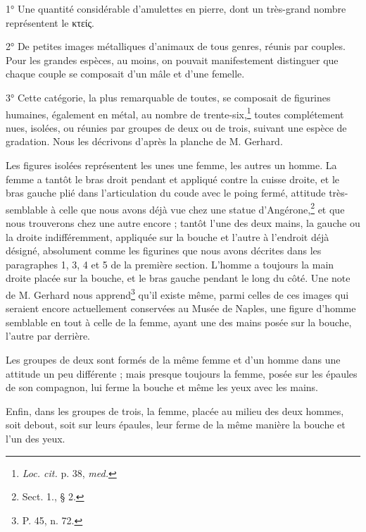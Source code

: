 \documentclass[a4paper, 11pt, oneside, polutonikogreek, french]{article}
\begin{document}
1° Une quantité considérable d'amulettes en pierre, dont un très-grand nombre représentent le κτείς.

2° De petites images métalliques d'animaux de tous genres, réunis par couples. Pour les grandes espèces, au moins, on pouvait manifestement distinguer que chaque couple se composait d'un mâle et d'une femelle.

3° Cette catégorie, la plus remarquable de toutes, se composait de figurines humaines, également en métal, au nombre de trente-six,\footnote{\emph{Loc. cit.} p. 38, \emph{med.}} toutes complétement nues, isolées, ou réunies par groupes de deux ou de trois, suivant une espèce de gradation. Nous les décrivons d'après la planche de M. Gerhard.

Les figures isolées représentent les unes une femme, les autres un homme. La femme a tantôt le bras droit pendant et appliqué contre la cuisse droite, et le bras gauche plié dans l'articulation du coude avec le poing fermé, attitude très-semblable à celle que nous avons déjà vue chez une statue d'Angérone,\footnote{Sect. 1., § 2.} et que nous trouverons chez une autre encore ; tantôt l'une des deux mains, la gauche ou la droite indifféremment, appliquée sur la bouche et l'autre à l'endroit déjà désigné, absolument comme les figurines que nous avons décrites dans les paragraphes 1, 3, 4 et 5 de la première section. L'homme a toujours la main droite placée sur la bouche, et le bras gauche pendant le long du côté. Une note de M. Gerhard nous apprend\footnote{P. 45, n. 72.} qu'il existe même, parmi celles de ces images qui seraient encore actuellement conservées au Musée de Naples, une figure d'homme semblable en tout à celle de la femme, ayant une des mains posée sur la bouche, l'autre par derrière.

Les groupes de deux sont formés de la même femme et d'un homme dans une attitude un peu différente ; mais presque toujours la femme, posée sur les épaules de son compagnon, lui ferme la bouche et même les yeux avec les mains.

Enfin, dans les groupes de trois, la femme, placée au milieu des deux hommes, soit debout, soit sur leurs épaules, leur ferme de la même manière la bouche et l'un des yeux.
\end{document}
